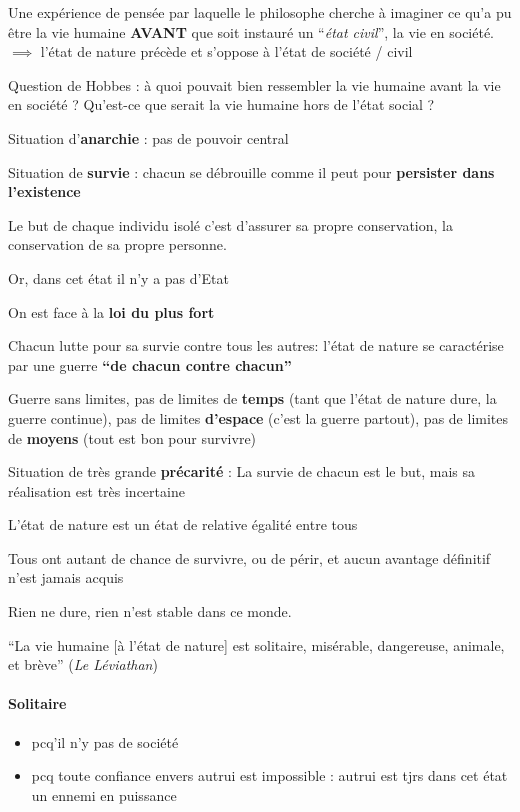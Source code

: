 \documentclass[
]{scrartcl}
\providecommand{\tightlist}{%
  \setlength{\itemsep}{0pt}\setlength{\parskip}{0pt}}
\begin{document}
Une expérience de pensée par laquelle le philosophe cherche à imaginer
ce qu'a pu être la vie humaine \textbf{AVANT} que soit instauré un
``\emph{état civil}'', la vie en société. \(\implies\) l'état de nature
précède et s'oppose à l'état de société / civil

Question de Hobbes : à quoi pouvait bien ressembler la vie humaine avant
la vie en société ? Qu'est-ce que serait la vie humaine hors de l'état
social ?

Situation d'\textbf{anarchie} : pas de pouvoir central

Situation de \textbf{survie} : chacun se débrouille comme il peut pour
\textbf{persister dans l'existence}

Le but de chaque individu isolé c'est d'assurer sa propre conservation,
la conservation de sa propre personne.

Or, dans cet état il n'y a pas d'Etat

On est face à la \textbf{loi du plus fort}

Chacun lutte pour sa survie contre tous les autres: l'état de nature se
caractérise par une guerre \textbf{``de chacun contre chacun''}

Guerre sans limites, pas de limites de \textbf{temps} (tant que l'état
de nature dure, la guerre continue), pas de limites \textbf{d'espace}
(c'est la guerre partout), pas de limites de \textbf{moyens} (tout est
bon pour survivre)

Situation de très grande \textbf{précarité} : La survie de chacun est le
but, mais sa réalisation est très incertaine

L'état de nature est un état de relative égalité entre tous

Tous ont autant de chance de survivre, ou de périr, et aucun avantage
définitif n'est jamais acquis

Rien ne dure, rien n'est stable dans ce monde.

``La vie humaine {[}à l'état de nature{]} est solitaire, misérable,
dangereuse, animale, et brève'' (\emph{Le Léviathan})

\hypertarget{solitaire}{%
\paragraph{Solitaire}\label{solitaire}}

\begin{itemize}
\tightlist
\item
  pcq'il n'y pas de société
\item
  pcq toute confiance envers autrui est impossible : autrui est tjrs
  dans cet état un ennemi en puissance
\end{itemize}
\end{document}

